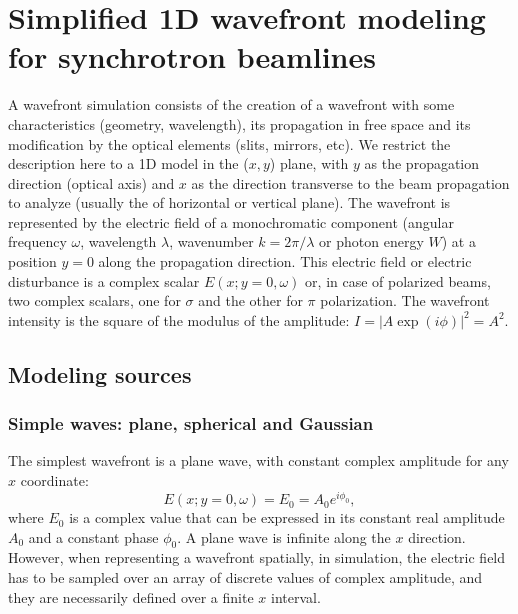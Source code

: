 \documentclass{iucr}
\begin{document}
%
%
%
\section{Simplified 1D wavefront modeling for synchrotron beamlines}
\label{sec:wofry}

A wavefront simulation consists of the creation of a wavefront with some characteristics (geometry, wavelength), its propagation in free space and its modification by the optical elements (slits, mirrors, etc). We restrict the description here to a 1D model in the ($x,y$) plane, with $y$ as the propagation direction (optical axis) and $x$ as the direction transverse to the beam propagation to analyze (usually the of horizontal or vertical plane). The wavefront is represented by the electric field of a monochromatic component (angular frequency $\omega$, wavelength $\lambda$, wavenumber $k = 2 \pi / \lambda$ or photon energy $W$) at a position $y=0$ along the propagation direction. This electric field or electric disturbance is a complex scalar $E(x;y=0,\omega)$ or, in case of polarized beams, two complex scalars, one for $\sigma$ and the other for $\pi$ polarization. The wavefront intensity is the square of the modulus of the amplitude: $I=|A \exp{(i\phi)}|^2=A^2$. 

\subsection{Modeling sources}
\label{sec:sources}

\subsubsection{Simple waves: plane, spherical and Gaussian}

The simplest wavefront is a plane wave, with constant complex amplitude for any $x$ coordinate: 
\begin{equation}
   E(x;y=0,\omega)=E_0=A_0 e^{i \phi_0},
\end{equation}
where $E_0$ is a complex value that can be expressed in its constant real amplitude $A_0$ and a constant phase $\phi_0$. A plane wave is infinite along the $x$ direction. However, when representing a wavefront spatially, in simulation, the electric field has to be sampled over an array of discrete values of complex amplitude, and they are necessarily defined over a finite $x$ interval. 
\end{document}
